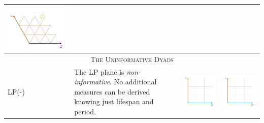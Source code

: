 \documentclass[12pt,oneside,a4paper]{article} %
\begin{document}
\begin{longtable}{m{}m{}m{}m{}}
  \includegraphics[scale=.5]{Figures/DiagramTable/LD_iso.pdf}  \\
  \midrule
  \multicolumn{4}{c}{\textsc{The Uninformative Dyads}} \\
  \midrule
  LP(-) &
  The LP plane is \emph{non-informative}. No additional measures can be derived knowing just lifespan and period. &
  \includegraphics[scale=.5]{Figures/DiagramTable/LP_rt.pdf} &
  \includegraphics[scale=.5]{Figures/DiagramTable/LP_rt.pdf} \\

\end{longtable}
\end{document}
